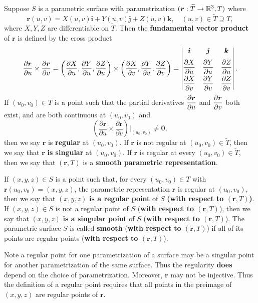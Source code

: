 \begin{definitionenv}
    Suppose $S$ is a parametric surface with parametrization $(\bm r:\widetilde T \to \mathbb{R}^3, T)$ where
    $$ \bm r(u,v) = X(u,v)\bm i + Y(u,v)\bm j + Z(u,v)\bm k,\quad (u,v)\in \widetilde T \supseteq T, $$
    where $X,Y,Z$ are differentiable on $\widetilde T$. Then the \textbf{fundamental vector product} of $\bm r$ is defined by the cross product
    $$ \dfrac{\partial \bm r}{\partial u}\times \dfrac{\partial \bm r}{\partial v} =
    \left(\pdv{X}{u}, \pdv{Y}{u}, \pdv{Z}{u}\right)\times \left(\pdv{X}{v}, \pdv{Y}{v}, \pdv{Z}{v}\right) =
    \begin{vmatrix}
        \bm i & \bm j & \bm k\\[6pt]
        \dfrac{\partial X}{\partial u} & \dfrac{\partial Y}{\partial u} & \dfrac{\partial Z}{\partial u}\\[6pt]
        \dfrac{\partial X}{\partial v} & \dfrac{\partial Y}{\partial v} & \dfrac{\partial Z}{\partial v}
    \end{vmatrix}. $$
    If $(u_0,v_0) \in T$ is a point such that the partial derivatives $\displaystyle \pdv{\bm r}{u}$ and $\displaystyle \pdv{\bm r}{v}$ both exist, and are both continuous at $(u_0,v_0)$ and
    $$ \left( \dfrac{\partial \bm r}{\partial u}\times \dfrac{\partial \bm r}{\partial v} \right) \Bigg|_{(u_0,v_0)} \neq \bm 0, $$
    then we say $\bm r$ is \textbf{regular} at $(u_0,v_0)$. If $\bm{r}$ is not regular at $(u_0, v_0) \in \widetilde{T}$, then we say that $\bm{r}$ \textbf{is singular} at $(u_0, v_0)$. If $\bm{r}$ is regular at every $(u_0, v_0) \in \widetilde{T}$, then we say that $(\bm{r}, T)$ is a \textbf{smooth parametric representation}.

    If $(x, y, z) \in S$ is a point such that, for every $(u_0, v_0) \in T$ with $\bm{r}(u_0, v_0) = (x, y, z)$, the parametric representation $\bm{r}$ is regular at $(u_0, v_0)$, then we say that $(x, y, z)$ \textbf{is a regular point} of $S$ \textbf{(with respect to $(\bm{r}, T)$)}. If $(x, y, z) \in S$ is not a regular point of $S$ (\textbf{with respect to $(\bm{r}, T)$}), then we say that $(x, y, z)$ \textbf{is a singular point} of $S$ (\textbf{with respect to $(\bm{r}, T)$}). The parametric surface $S$ is called \textbf{smooth} (\textbf{with respect to $(\bm{r}, T)$}) if all of its points are regular points (\textbf{with respect to $(\bm{r}, T)$}).
\end{definitionenv}
\begin{remarkenv}
    Note a regular point for one parametrization of a surface may be a singular point for another parametrization of the same surface. Thus the regularity \textbf{does} depend on the choice of parametrization. Moreover, $\bm r$ may not be injective. Thus the definition of a regular point requires that all points in the preimage of $(x, y, z)$ are regular points of $\bm r$.
\end{remarkenv}
